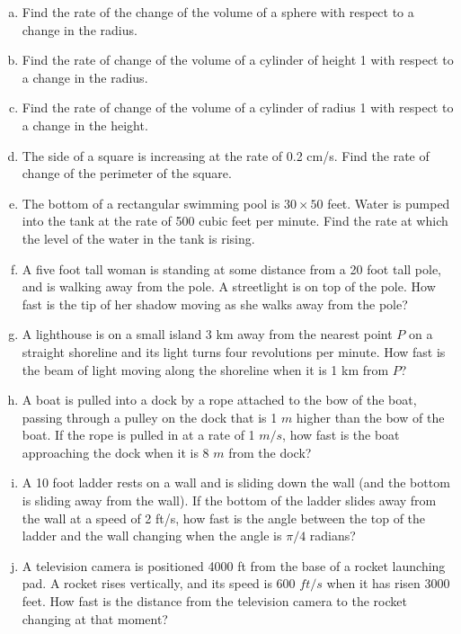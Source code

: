\documentclass[12pt]{article}
\begin{document}
\begin{enumerate}[(a)]
\item
Find the rate of the change of the volume of a sphere with respect
to a change in the radius.

\item
Find the rate of change of the volume of a cylinder of height 1
with respect to a change in the radius.

\item
Find the rate of change of the volume of a cylinder of radius 1
with respect to a change in the height.

\item
The side of a square is increasing at the rate of 0.2 cm/s.
Find the rate of change of the perimeter of the square.

\item

The bottom of a rectangular swimming pool is $30 \times 50$ feet.
Water is pumped into the tank at the rate of 500 cubic feet per minute.
Find the rate at which the level of the water in the tank is rising.

\item
A five foot tall woman is standing at some distance from a 20 foot tall pole,
and is walking away from the pole. A streetlight
is on top of the pole. How fast is the tip of her shadow moving as she
walks away from the pole?

\item
A lighthouse is on a small island 3 km away from the nearest point $P$ on 
a straight shoreline and its
light turns four revolutions per minute. 
How fast is the beam of light moving along the shoreline when it is 1 km
from $P$?

\item
A boat is pulled into a dock by a rope attached to the bow of the boat,
passing through a pulley on the dock that is 1 $m$ higher than the bow
of the boat. If the rope is pulled in at a rate of 1 $m/s$, how
fast is the boat approaching the dock when it is 8 $m$ from the dock?

\item
A 10 foot ladder rests on a wall and is sliding down the wall (and the bottom is sliding away from the wall). 
If the bottom of the ladder slides away from the wall at a speed of
2 ft/s, how fast is the angle between the top of the ladder and the
wall changing when the angle is $\pi/4$ radians?

\item
A television camera is positioned 4000 ft from the base of a rocket launching
pad. A rocket rises vertically, and its speed is 600 $ft/s$ when
it has risen 3000 feet.
How fast is the distance from the television camera to the
rocket changing at that moment?


\end{enumerate}
\end{document}
